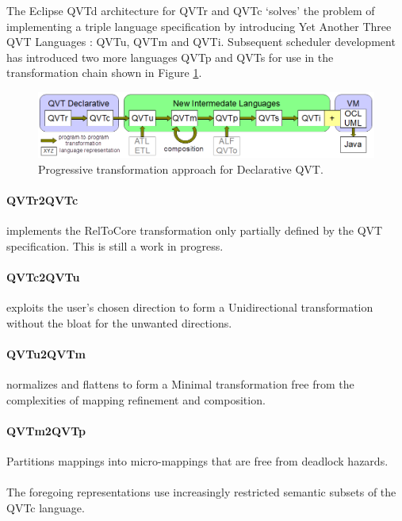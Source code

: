 \documentclass{llncs}
\begin{document}
The Eclipse QVTd architecture for QVTr and QVTc `solves' the problem of  implementing a triple language specification by introducing Yet Another Three QVT Languages\cite{ya3qvt} : QVTu, QVTm and QVTi. Subsequent scheduler development has introduced two more languages QVTp and QVTs for use in the transformation chain shown in Figure \ref{fig:architecture}.

\begin{figure}[h]
	\centering
	\includegraphics[width=1.0\textwidth]{QVThorizontalAlphabet.png}
	\caption{Progressive transformation approach for Declarative QVT.}
	\label{fig:architecture}
\end{figure}

\paragraph{QVTr2QVTc} implements the RelToCore transformation only partially defined by the QVT specification. This is still a work in progress.

\paragraph{QVTc2QVTu} exploits the user's chosen direction to form a Unidirectional transformation without the bloat for the unwanted directions.

\paragraph{QVTu2QVTm} normalizes and flattens to form a Minimal transformation free from the complexities of mapping refinement and composition.

\paragraph{QVTm2QVTp} Partitions mappings into micro-mappings that are free from deadlock hazards.

\paragraph{}The foregoing representations use increasingly restricted semantic subsets of the QVTc language.
\end{document}

